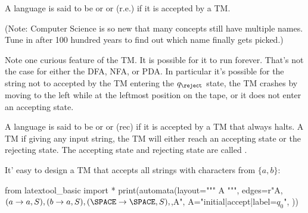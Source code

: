 \begin{defn}
A language is said to be
or
or
 (r.e.)
if it is accepted by a TM.
\end{defn}

(Note: 
Computer Science is so new that many concepts still have multiple names.
Tune in after 100 hundred years to find out which name finally gets picked.)

Note one curious feature of the TM. It is possible for it to run
forever. That's not the case for either the DFA, NFA, or PDA. In
particular it's possible for the string not to accepted by the TM
entering the $q_{\reject}$ state, the TM crashes by moving to the
left while at the leftmost position on the tape, or it does not
enter an accepting state.

\begin{defn}
A language is said to be
or
or
 (rec)
if it is
accepted by a TM that always halts. A TM  if
giving any input string, the TM will either reach an accepting
state or the rejecting state. The accepting state and rejecting
state are called .
\end{defn}


\newpage
\begin{eg}
It' easy to design a TM that accepts all strings with
characters from $\{a, b\}$:


\begin{python}
from latextool_basic import *
print(automata(layout="""
A
""",
edges=r"A,$(a\rightarrow a, S), (b\rightarrow a, S),(\SPACE\rightarrow \SPACE, S), $,A",
A="initial|accept|label=$q_0$",
))
\end{python}

\end{eg}
  
